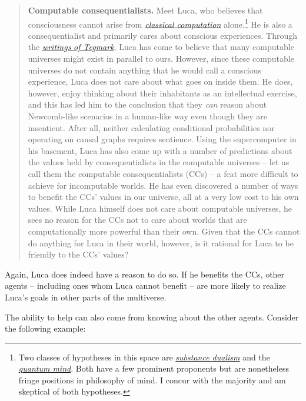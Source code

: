 \begin{quote}
\textbf{Computable consequentialists.} Meet Luca, who believes that
consciousness cannot arise from
\href{https://en.wikipedia.org/wiki/Computability}{\emph{classical
computation}} alone.\footnote{Two classes of hypotheses in this space
  are
  \href{https://en.wikipedia.org/wiki/Mind\%E2\%80\%93body_dualism\#Substance_dualism}{\emph{substance
  dualism}} and the
  \href{https://en.wikipedia.org/wiki/Quantum_mind}{\emph{quantum
  mind}}. Both have a few prominent proponents but are nonetheless
  fringe positions in philosophy of mind. I concur with the majority and
  am skeptical of both hypotheses.} He is also a consequentialist and
primarily cares about conscious experiences. Through the
\href{https://en.wikipedia.org/wiki/Mathematical_universe_hypothesis}{\emph{writings}
\emph{of Tegmark}}, Luca has come to believe that many computable
universes might exist in parallel to ours. However, since these
computable universes do not contain anything that he would call a
conscious experience, Luca does not care about what goes on inside them.
He does, however, enjoy thinking about their inhabitants as an
intellectual exercise, and this has led him to the conclusion that they
\emph{can} reason about Newcomb-like scenarios in a human-like way even
though they are insentient. After all, neither calculating conditional
probabilities nor operating on causal graphs requires sentience. Using
the supercomputer in his basement, Luca has also come up with a number
of predictions about the values held by consequentialists in the
computable universes -- let us call them the computable
consequentialists (CCs) -- a feat more difficult to achieve for
incomputable worlds. He has even discovered a number of ways to benefit
the CCs' values in our universe, all at a very low cost to his own
values. While Luca himself does not care about computable universes, he
sees no reason for the CCs not to care about worlds that are
computationally more powerful than their own. Given that the CCs cannot
do anything for Luca in their world, however, is it rational for Luca to
be friendly to the CCs' values?
\end{quote}

Again, Luca does indeed have a reason to do so. If he benefits the CCs,
other agents -- including ones whom Luca cannot benefit -- are more
likely to realize Luca's goals in other parts of the multiverse.

The ability to help can also come from knowing about the other agents.
Consider the following example:

